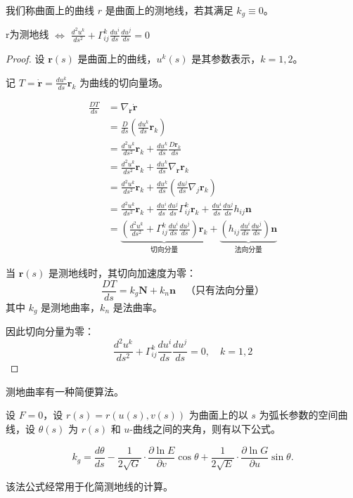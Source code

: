 \documentclass[lang=cn,10pt,thmcnt=section]{elegantbook}
\begin{document}
\begin{definition}
    我们称曲面上的曲线 $r$ 是曲面上的测地线，若其满足 $k_g \equiv 0$。
\end{definition}

\begin{theorem}
    r为测地线 $\Leftrightarrow$ $\frac{d^2 u^k}{ds^2} + \Gamma_{ij}^k \frac{du^i}{ds} \frac{du^j}{ds} = 0$
\end{theorem}

\begin{proof}
    设 $\mathbf{r}(s)$ 是曲面上的曲线，$u^k(s)$ 是其参数表示，$k=1,2$。

    记 $T = \dot{\mathbf{r}} = \frac{du^k}{ds} \mathbf{r}_k$ 为曲线的切向量场。
    
    \begin{align*}
        \frac{DT}{ds} &= \nabla_{\dot{\mathbf{r}}} \dot{\mathbf{r}} \\
        &= \frac{D}{ds} \left( \frac{du^k}{ds} \mathbf{r}_k \right) \\
        &= \frac{d^2 u^k}{ds^2} \mathbf{r}_k + \frac{du^k}{ds} \frac{D\mathbf{r}_k}{ds} \\
        &= \frac{d^2 u^k}{ds^2} \mathbf{r}_k + \frac{du^k}{ds} \nabla_{\dot{\mathbf{r}}} \mathbf{r}_k \\
        &= \frac{d^2 u^k}{ds^2} \mathbf{r}_k + \frac{du^k}{ds} \left( \frac{du^j}{ds} \nabla_j \mathbf{r}_k \right) \\
        &= \frac{d^2 u^k}{ds^2} \mathbf{r}_k + \frac{du^i}{ds} \frac{du^j}{ds} \Gamma_{ij}^k \mathbf{r}_k + \frac{du^i}{ds} \frac{du^j}{ds} h_{ij} \mathbf{n} \\
        &= \underbrace{\left( \frac{d^2 u^k}{ds^2} + \Gamma_{ij}^k \frac{du^i}{ds} \frac{du^j}{ds} \right) \mathbf{r}_k}_{\text{切向分量}} + \underbrace{\left( h_{ij} \frac{du^i}{ds} \frac{du^j}{ds} \right) \mathbf{n}}_{\text{法向分量}}
    \end{align*}
    
    当 $\mathbf{r}(s)$ 是测地线时，其切向加速度为零：
    \[
    \frac{DT}{ds} = k_g \mathbf{N} + k_n \mathbf{n} \quad \text{（只有法向分量）}
    \]
    其中 $k_g$ 是测地曲率，$k_n$ 是法曲率。
    
    因此切向分量为零：
    \[
    \frac{d^2 u^k}{ds^2} + \Gamma_{ij}^k \frac{du^i}{ds} \frac{du^j}{ds} = 0, \quad k=1,2
    \]
    

\end{proof}


测地曲率有一种简便算法。
\begin{theorem}[Liouville公式]
    设 $\boxed{F = 0}$，设 $r(s) = r(u(s), v(s))$ 为曲面上的以 $s$ 为弧长参数的空间曲线，设 $\theta(s)$ 为 $r(s)$ 和 $u$-曲线之间的夹角，则有以下公式。

\[
k_g = \frac{d\theta}{ds} - \frac{1}{2\sqrt{G}} \cdot \frac{\partial \ln E}{\partial v} \cos\theta + \frac{1}{2\sqrt{E}} \cdot \frac{\partial \ln G}{\partial u} \sin\theta.
\]

该法公式经常用于化简测地线的计算。

\end{theorem}
\end{document}

